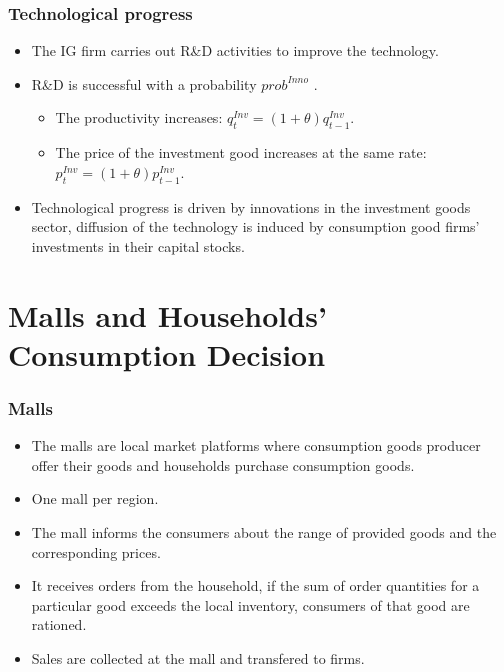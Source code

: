 \documentclass{beamer}
\begin{document}
\frame
{

  \frametitle{Technological progress} 
\begin{itemize}

\item The IG firm carries out R\&D activities to improve the technology.

\item R\&D is successful with a probability $prob^{Inno}$ .
\begin{itemize}
	
	\item The productivity increases: $q_t^{Inv}=(1+\theta)q_{t-1}^{Inv}$.
	
	\item The price of the investment good increases at the same rate: $p_t^{Inv}=(1+\theta)p_{t-1}^{Inv}$.

\end{itemize}

\item Technological progress is driven by innovations in the investment goods sector, diffusion of the technology is induced by consumption good firms' investments in their capital stocks.
  

\end{itemize}
  
}

\section{Malls and Households' Consumption Decision}

\frame
{

  \frametitle{Malls} 
\begin{itemize}

\item The malls are local market platforms where consumption goods producer offer their goods and households purchase consumption goods.
\item One mall per region.
\item The mall informs the consumers about the range of provided goods and the corresponding prices.
\item It receives  orders from the household, if the sum of order quantities for a particular good exceeds the local inventory, consumers of that good are rationed.
\item Sales are collected at the mall and transfered to firms. 
  

\end{itemize}



  
}
\end{document}
